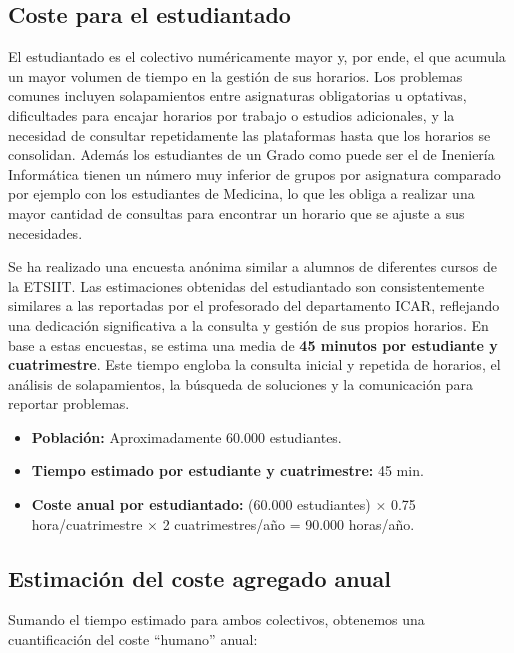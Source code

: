 \subsection{Coste para el estudiantado}

El estudiantado es el colectivo numéricamente mayor y, por ende, el que acumula un mayor volumen de tiempo en la gestión de sus horarios. Los problemas comunes incluyen solapamientos entre asignaturas obligatorias u optativas, dificultades para encajar horarios por trabajo o estudios adicionales, y la necesidad de consultar repetidamente las plataformas hasta que los horarios se consolidan. Además los estudiantes de un Grado como puede ser el de Ineniería Informática tienen un número muy inferior de grupos por asignatura comparado por ejemplo con los estudiantes de Medicina, lo que les obliga a realizar una mayor cantidad de consultas para encontrar un horario que se ajuste a sus necesidades.\newline

Se ha realizado una encuesta anónima similar a alumnos de diferentes cursos de la ETSIIT. Las estimaciones obtenidas del estudiantado son consistentemente similares a las reportadas por el profesorado del departamento ICAR, reflejando una dedicación significativa a la consulta y gestión de sus propios horarios. En base a estas encuestas, se estima una media de \textbf{45 minutos por estudiante y cuatrimestre}. Este tiempo engloba la consulta inicial y repetida de horarios, el análisis de solapamientos, la búsqueda de soluciones y la comunicación para reportar problemas.

\begin{itemize}
    \item \textbf{Población:} Aproximadamente 60.000 estudiantes.
    \item \textbf{Tiempo estimado por estudiante y cuatrimestre:} 45 min.
    \item \textbf{Coste anual por estudiantado:} (60.000 estudiantes) $\times$ 0.75 hora/cuatrimestre $\times$ 2 cuatrimestres/año = 90.000 horas/año.
\end{itemize}

\subsection{Estimación del coste agregado anual}

Sumando el tiempo estimado para ambos colectivos, obtenemos una cuantificación del coste ``humano'' anual:

